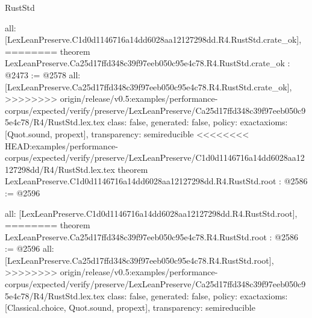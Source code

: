 \begin{lexlean}{RustStd}
\begin{coremodule}
{\begin{coremodule}
{{{{{{  all: [LexLeanPreserve.C1d0d1146716a14dd6028aa12127298dd.R4.RustStd.crate_ok],
========
theorem LexLeanPreserve.Ca25d17ffd348c39f97eeb050c95e4c78.R4.RustStd.crate_ok : @2473 := @2578 {
  all: [LexLeanPreserve.Ca25d17ffd348c39f97eeb050c95e4c78.R4.RustStd.crate_ok],
>>>>>>>> origin/release/v0.5:examples/performance-corpus/expected/verify/preserve/LexLeanPreserve/Ca25d17ffd348c39f97eeb050c95e4c78/R4/RustStd.lex.tex
  class: false,
  generated: false,
  policy: exact{axioms: [Quot.sound, propext]},
  transparency: semireducible
}
<<<<<<<< HEAD:examples/performance-corpus/expected/verify/preserve/LexLeanPreserve/C1d0d1146716a14dd6028aa12127298dd/R4/RustStd.lex.tex
theorem LexLeanPreserve.C1d0d1146716a14dd6028aa12127298dd.R4.RustStd.root : @2586 := @2596 {
  all: [LexLeanPreserve.C1d0d1146716a14dd6028aa12127298dd.R4.RustStd.root],
========
theorem LexLeanPreserve.Ca25d17ffd348c39f97eeb050c95e4c78.R4.RustStd.root : @2586 := @2596 {
  all: [LexLeanPreserve.Ca25d17ffd348c39f97eeb050c95e4c78.R4.RustStd.root],
>>>>>>>> origin/release/v0.5:examples/performance-corpus/expected/verify/preserve/LexLeanPreserve/Ca25d17ffd348c39f97eeb050c95e4c78/R4/RustStd.lex.tex
  class: false,
  generated: false,
  policy: exact{axioms: [Classical.choice, Quot.sound, propext]},
  transparency: semireducible
}

}}}}}}}
\end{coremodule}}
\end{coremodule}
\end{lexlean}
